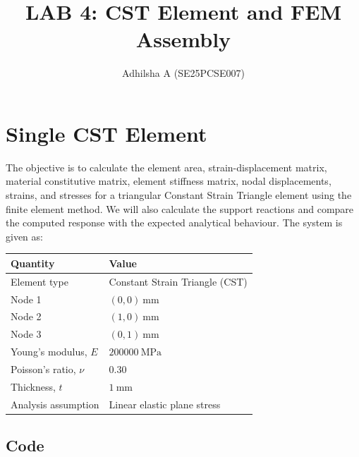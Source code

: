 \title{LAB 4:  CST Element and FEM Assembly}

\author{Adhilsha A (SE25PCSE007)}
\maketitle

\tableofcontents

\section{Single CST Element}

The objective is to  calculate the element area, strain-displacement matrix,
material constitutive matrix, element stiffness matrix, nodal displacements,
strains, and stresses for a triangular Constant Strain Triangle element using the finite
element method. We will also calculate the support reactions and compare the
computed response with the expected analytical behaviour. The system is given as:
\begin{table}[h!]
\centering
\begin{tabular}{ll}
\toprule
\textbf{Quantity} & \textbf{Value} \\
\midrule
Element type & Constant Strain Triangle (CST) \\
Node 1 & $(0,0)\ \si{\milli\metre}$ \\
Node 2 & $(1,0)\ \si{\milli\metre}$ \\
Node 3 & $(0,1)\ \si{\milli\metre}$ \\
Young's modulus, $E$ & $\SI{200000}{\mega\pascal}$ \\
Poisson's ratio, $\nu$ & $0.30$ \\
Thickness, $t$ & $\SI{1}{\milli\metre}$ \\
Analysis assumption & Linear elastic plane stress \\
\bottomrule
\end{tabular}
\end{table}

\subsection{Code}

